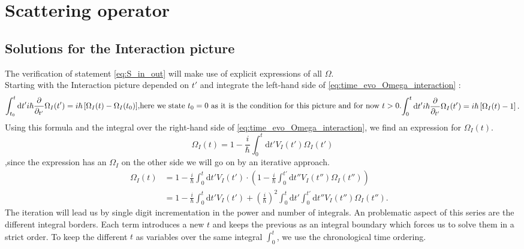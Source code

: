 \documentclass[12pt, titlepage]{article}
\begin{document}
\section{Scattering operator}
\subsection{Solutions for the Interaction picture}
The verification of statement \eqref{eq:S_in_out} will make use of explicit expressions of all $ \Omega $.\\
Starting with the Interaction picture depended on $ t' $  and integrate the left-hand side of \eqref{eq:time_evo_Omega_interaction} :
\begin{subequations}
\begin{align}
\int_{t_{0}}^{t}\mathrm{d}t'
 i\hbar 
 \frac{\partial}{\partial_{t'}} 
 \Omega_{I} (t')
 =
 i\hbar
 \left[ 
\Omega_{I}(t) -\Omega_{I}(t_{0})
 \right] 
\end{align}
\text{,here we state $ t_{0} = 0 $ as it is the condition for this picture and for now $ t>0 $.}
\begin{align}
\int_{0}^{t}\mathrm{d}t'
 i\hbar 
 \frac{\partial}{\partial_{t'}} 
 \Omega_{I} (t')
 =
 i\hbar
 \left[ 
\Omega_{I}(t) -1
 \right] 
 .
\end{align}
\end{subequations}
Using this formula and the integral over the right-hand side of \eqref{eq:time_evo_Omega_interaction}, we find an expression for $ \Omega_{I}(t) $.
\begin{equation}
\Omega_{I}(t)=
1
-
\frac{i}{\hbar} 
\int_{0}^{t}\mathrm{d}t'V_{I}(t')\Omega_{I}(t')	
\end{equation}
,since the expression has an $ \Omega_{I} $ on the other side we will go on by an iterative approach.
\begin{subequations}
\begin{align}
\Omega_{I}(t)
&=
1
-
\frac{i}{\hbar} 
\int_{0}^{t}\mathrm{d}t'V_{I}(t')
\cdot
\left( 
1
-
\frac{i}{\hbar} 
\int_{0}^{t'}\mathrm{d}t''V_{I}(t'')\Omega_{I}(t'')
\right) 
&\\
&=
1
-
\frac{i}{\hbar} 
\int_{0}^{t}\mathrm{d}t'V_{I}(t')
+(\frac{i}{\hbar})^{2} 
\int_{0}^{t}\mathrm{d}t'
\int_{0}^{t'}\mathrm{d}t''
V_{I}(t'')\Omega_{I}(t'').
\end{align}
\end{subequations}
The iteration will lead us by single digit incrementation in the power and number of integrals. An problematic aspect of this series are the different integral borders. Each term introduces a new $ t $ and keeps the previous as an integral boundary which forces us to solve them in a strict order. To keep the different $ t $ as variables over the same integral $ \int_{0}^{t} $, we use the chronological time ordering.
\end{document}
